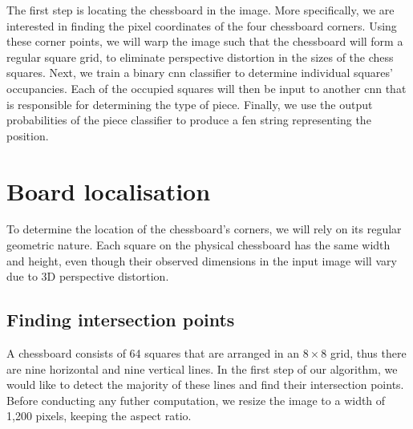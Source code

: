 \documentclass[../main.tex]{subfiles}
\begin{document}
The first step is locating the chessboard in the image.
More specifically, we are interested in finding the pixel coordinates of the four chessboard corners. 
Using these corner points, we will warp the image such that the chessboard will form a regular square grid, to eliminate perspective distortion in the sizes of the chess squares.
Next, we train a binary \gls{cnn} classifier to determine individual squares' occupancies.
Each of the occupied squares will then be input to another \gls{cnn} that is responsible for determining the type of piece. 
Finally, we use the output probabilities of the piece classifier to produce a \gls{fen} string representing the position. 


\section{Board localisation}
\label{sec:board_localisation}
To determine the location of the chessboard's corners, we will rely on its regular geometric nature. 
Each square on the physical chessboard has the same width and height, even though their observed dimensions in the input image will vary due to 3D perspective distortion.

\subsection{Finding intersection points}
\label{sec:find_intersection_points}
A chessboard consists of 64 squares that are arranged in an $8\times 8$ grid, thus there are nine horizontal and nine vertical lines.
In the first step of our algorithm, we would like to detect the majority of these lines and find their intersection points.
Before conducting any futher computation, we resize the image to a width of 1,200 pixels, keeping the aspect ratio.
\end{document}

